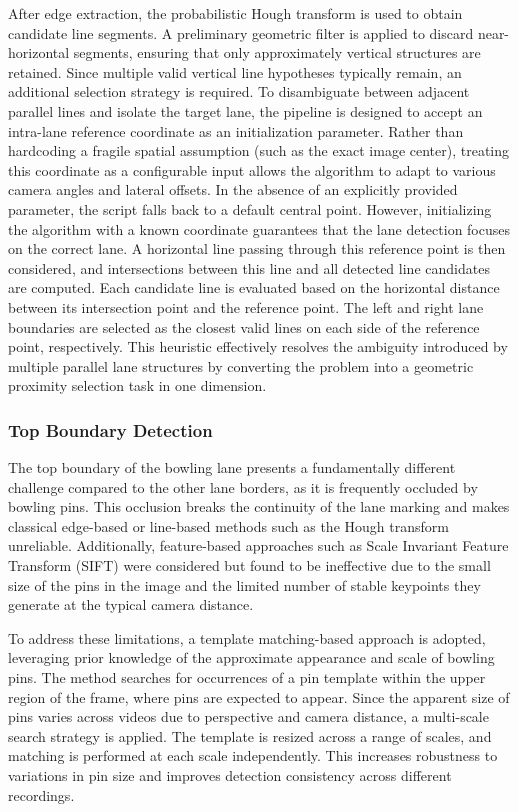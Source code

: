 After edge extraction, the probabilistic Hough transform is used to obtain candidate line segments. A preliminary geometric filter is applied to discard near-horizontal segments, ensuring that only approximately vertical structures are retained.
Since multiple valid vertical line hypotheses typically remain, an additional selection strategy is required. To disambiguate between adjacent parallel lines and isolate the target lane, the pipeline is designed to accept an intra-lane reference coordinate as an initialization parameter. Rather than hardcoding a fragile spatial assumption (such as the exact image center), treating this coordinate as a configurable input allows the algorithm to adapt to various camera angles and lateral offsets. In the absence of an explicitly provided parameter, the script falls back to a default central point. However, initializing the algorithm with a known coordinate guarantees that the lane detection focuses on the correct lane.
A horizontal line passing through this reference point is then considered, and intersections between this line and all detected line candidates are computed. Each candidate line is evaluated based on the horizontal distance between its intersection point and the reference point. The left and right lane boundaries are selected as the closest valid lines on each side of the reference point, respectively.
This heuristic effectively resolves the ambiguity introduced by multiple parallel lane structures by converting the problem into a geometric proximity selection task in one dimension. 


\subsubsection{Top Boundary Detection}
The top boundary of the bowling lane presents a fundamentally different challenge compared to the other lane borders, as it is frequently occluded by bowling pins. This occlusion breaks the continuity of the lane marking and makes classical edge-based or line-based methods such as the Hough transform unreliable. Additionally, feature-based approaches such as Scale Invariant Feature Transform (SIFT)\cite{lowe2004sift} were considered but found to be ineffective due to the small size of the pins in the image and the limited number of stable keypoints they generate at the typical camera distance.

To address these limitations, a template matching-based approach is adopted, leveraging prior knowledge of the approximate appearance and scale of bowling pins. The method searches for occurrences of a pin template within the upper region of the frame, where pins are expected to appear.
Since the apparent size of pins varies across videos due to perspective and camera distance, a multi-scale search strategy is applied. The template is resized across a range of scales, and matching is performed at each scale independently. This increases robustness to variations in pin size and improves detection consistency across different recordings.

